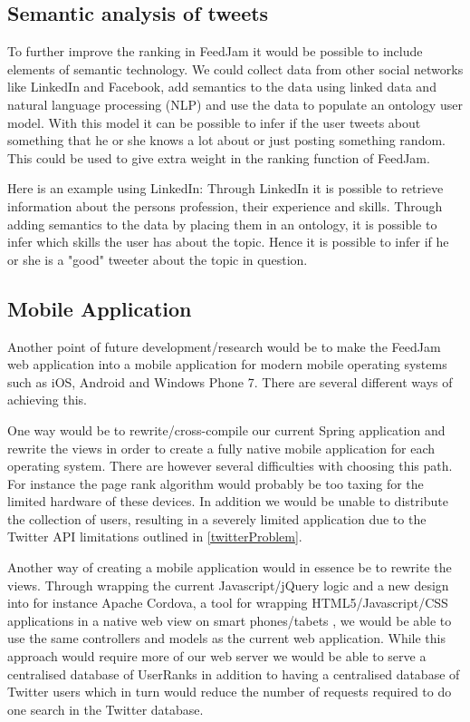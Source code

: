 \subsection{Semantic analysis of tweets} %
\label{semtanticAnalysation}
To further improve the ranking in FeedJam it would be possible to include elements of semantic technology. We could collect data from other social networks like LinkedIn and Facebook, add semantics to the data using linked data and natural language processing (NLP) and use the data to populate an ontology user model. With this model it can be possible to infer if the user tweets about something that he or she knows a lot about or just posting something random. This could be used to give extra weight in the ranking function of FeedJam. 

Here is an example using LinkedIn: Through LinkedIn it is possible to retrieve information about the persons profession, their experience and skills. Through adding semantics to the data by placing them in an ontology, it is possible to infer which skills the user has about the topic. Hence it is possible to infer if he or she is a "good" tweeter about the topic in question.

\subsection{Mobile Application}
Another point of future development/research would be to make the FeedJam web application into a mobile application for modern mobile operating systems such as iOS, Android and Windows Phone 7. There are several different ways of achieving this. 

One way would be to rewrite/cross-compile our current Spring application and rewrite the views in order to create a fully native mobile application for each operating system. There are however several difficulties with choosing this path. For instance the page rank algorithm would probably be too taxing for the limited hardware of these devices. In addition we would be unable to distribute the collection of users, resulting in a severely limited application due to the Twitter API limitations outlined in \ref{twitterProblem}.

Another way of creating a mobile application would in essence be to rewrite the views. Through wrapping the current Javascript/jQuery logic and a new design into for instance Apache Cordova, a tool for wrapping HTML5/Javascript/CSS applications in a native web view on smart phones/tabets \cite{ApacheCordova}, we would be able to use the same controllers and models as the current web application. While this approach would require more of our web server we would be able to serve a centralised database of UserRanks in addition to having a centralised database of Twitter users which in turn would reduce the number of requests required to do one search in the Twitter database.

